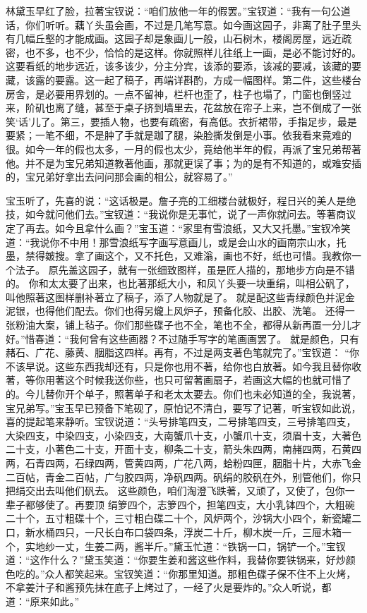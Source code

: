 \begin{parag}
    林黛玉早红了脸，拉著宝钗说：“咱们放他一年的假罢。”宝钗道：“我有一句公道话，你们听听。藕丫头虽会画，不过是几笔写意。如今画这园子，非离了肚子里头有几幅丘壑的才能成画。这园子却是象画儿一般，山石树木，楼阁房屋，远近疏密，也不多，也不少，恰恰的是这样。你就照样儿往纸上一画，是必不能讨好的。这要看纸的地步远近，该多该少，分主分宾，该添的要添，该减的要减，该藏的要藏，该露的要露。这一起了稿子，再端详斟酌，方成一幅图样。第二件，这些楼台房舍，是必要用界划的。一点不留神，栏杆也歪了，柱子也塌了，门窗也倒竖过来，阶矶也离了缝，甚至于桌子挤到墙里去，花盆放在帘子上来，岂不倒成了一张笑‘话’儿了。第三，要插人物，也要有疏密，有高低。衣折裙带，手指足步，最是要紧；一笔不细，不是肿了手就是跏了腿，染脸撕发倒是小事。依我看来竟难的很。如今一年的假也太多，一月的假也太少，竟给他半年的假，再派了宝兄弟帮著他。并不是为宝兄弟知道教著他画，那就更误了事；为的是有不知道的，或难安插的，宝兄弟好拿出去问问那会画的相公，就容易了。”
\end{parag}


\begin{parag}
    宝玉听了，先喜的说：“这话极是。詹子亮的工细楼台就极好，程日兴的美人是绝技，如今就问他们去。”宝钗道：“我说你是无事忙，说了一声你就问去。等著商议定了再去。如今且拿什么画？”宝玉道：“家里有雪浪纸，又大又托墨。”宝钗冷笑道：“我说你不中用！那雪浪纸写字画写意画儿，或是会山水的画南宗山水，托墨，禁得皴搜。拿了画这个，又不托色，又难滃，画也不好，纸也可惜。我教你一个法子。
    原先盖这园子，就有一张细致图样，虽是匠人描的，那地步方向是不错的。
    你和太太要了出来，也比著那纸大小，和凤丫头要一块重绢，叫相公矾了，叫他照著这图样删补著立了稿子，添了人物就是了。
    就是配这些青绿颜色并泥金泥银，也得他们配去。你们也得另爖上风炉子，预备化胶、出胶、洗笔。
    还得一张粉油大案，铺上毡子。你们那些碟子也不全，笔也不全，都得从新再置一分儿才好。”惜春道：“我何曾有这些画器？不过随手写字的笔画画罢了。
    就是颜色，只有赭石、广花、藤黄、胭脂这四样。再有，不过是两支著色笔就完了。”宝钗道： “你不该早说。这些东西我却还有，只是你也用不著，给你也白放著。如今我且替你收著，等你用著这个时候我送你些，也只可留著画扇子，若画这大幅的也就可惜了的。今儿替你开个单子，照著单子和老太太要去。你们也未必知道的全，我说著，宝兄弟写。”宝玉早已预备下笔砚了，原怕记不清白，要写了记著，听宝钗如此说，喜的提起笔来静听。宝钗说道：“头号排笔四支，二号排笔四支，三号排笔四支，大染四支，中染四支，小染四支，大南蟹爪十支，小蟹爪十支，须眉十支，大著色二十支，小著色二十支，开面十支，柳条二十支，箭头朱四两，南赭四两，石黄四两，石青四两，石绿四两，管黄四两，广花八两，蛤粉四匣，胭脂十片，大赤飞金二百帖，青金二百帖，广匀胶四两，净矾四两。矾绢的胶矾在外，别管他们，你只把绢交出去叫他们矾去。
    这些颜色，咱们淘澄飞跌著，又顽了，又使了，包你一辈子都够使了。再要顶 绢箩四个，志箩四个，担笔四支，大小乳钵四个，大粗碗二十个，五寸粗碟十个，三寸粗白碟二十个，风炉两个，沙锅大小四个，新瓷罐二口，新水桶四只，一尺长白布口袋四条，浮炭二十斤，柳木炭一斤，三屉木箱一个，实地纱一丈，生姜二两，酱半斤。”黛玉忙道：“铁锅一口，锅铲一个。”宝钗道：“这作什么？”黛玉笑道：“你要生姜和酱这些作料，我替你要铁锅来，好炒颜色吃的。”众人都笑起来。宝钗笑道：“你那里知道。那粗色碟子保不住不上火烤，不拿姜汁子和酱预先抹在底子上烤过了，一经了火是要炸的。”众人听说，都道：“原来如此。”
\end{parag}


